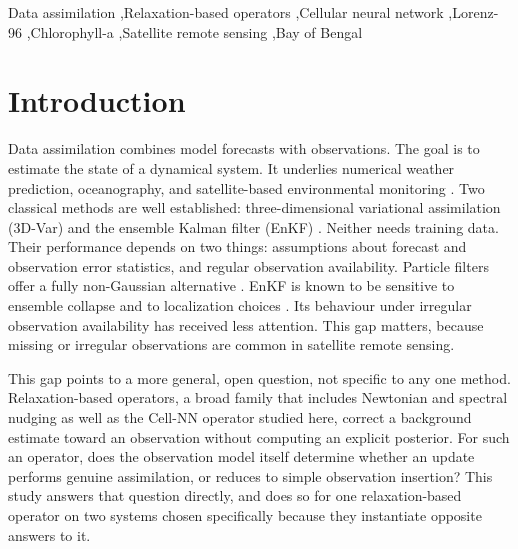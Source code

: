 \documentclass[final,5p,times,twocolumn,authoryear]{elsarticle}
\begin{document}
\begin{frontmatter}
\begin{keyword}
Data assimilation \sep Relaxation-based operators \sep Cellular
neural network \sep Lorenz-96 \sep Chlorophyll-a \sep Satellite
remote sensing \sep Bay of Bengal
\end{keyword}

\end{frontmatter}

\section{Introduction}

Data assimilation combines model forecasts with observations. The
goal is to estimate the state of a dynamical system. It underlies
numerical weather prediction, oceanography, and satellite-based
environmental monitoring \citep{kalnay2003}. Two classical methods
are well established: three-dimensional variational assimilation
(3D-Var) and the ensemble Kalman filter (EnKF)
\citep{talagrand1987,courtier1994,evensen1994,evensen2003}. Neither
needs training data. Their performance depends on two things:
assumptions about forecast and observation error statistics, and
regular observation availability. Particle filters offer a fully
non-Gaussian alternative \citep{vanleeuwen2009}. EnKF is known to be
sensitive to ensemble collapse and to localization choices
\citep{hunt2007}. Its behaviour under irregular observation
availability has received less attention. This gap matters, because
missing or irregular observations are common in satellite remote
sensing.

This gap points to a more general, open question, not specific to any
one method. Relaxation-based operators, a broad family that includes
Newtonian and spectral nudging as well as the Cell-NN operator studied
here, correct a background estimate toward an observation without
computing an explicit posterior. For such an operator, does the
observation model itself determine whether an update performs genuine
assimilation, or reduces to simple observation insertion? This study
answers that question directly, and does so for one relaxation-based
operator on two systems chosen specifically because they instantiate
opposite answers to it.
\end{document}
